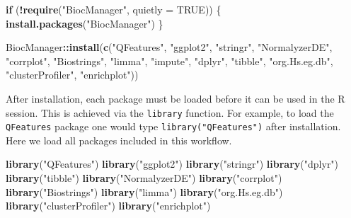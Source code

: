 \documentclass[9pt,a4paper,]{extarticle}
\newenvironment{Shaded}{\begin{snugshade}}{\end{snugshade}}
\newcommand{\AttributeTok}[1]{\textcolor[rgb]{0.13,0.29,0.53}{#1}}
\newcommand{\ConstantTok}[1]{\textcolor[rgb]{0.56,0.35,0.01}{#1}}
\newcommand{\ControlFlowTok}[1]{\textcolor[rgb]{0.13,0.29,0.53}{\textbf{#1}}}
\newcommand{\FunctionTok}[1]{\textcolor[rgb]{0.13,0.29,0.53}{\textbf{#1}}}
\newcommand{\NormalTok}[1]{#1}
\newcommand{\SpecialCharTok}[1]{\textcolor[rgb]{0.81,0.36,0.00}{\textbf{#1}}}
\newcommand{\StringTok}[1]{\textcolor[rgb]{0.31,0.60,0.02}{#1}}
\begin{document}
\begin{Shaded}
\begin{Highlighting}[]
\ControlFlowTok{if}\NormalTok{ (}\SpecialCharTok{!}\FunctionTok{require}\NormalTok{(}\StringTok{"BiocManager"}\NormalTok{, }\AttributeTok{quietly =} \ConstantTok{TRUE}\NormalTok{)) \{}
  \FunctionTok{install.packages}\NormalTok{(}\StringTok{"BiocManager"}\NormalTok{)}
\NormalTok{\}}

\NormalTok{BiocManager}\SpecialCharTok{::}\FunctionTok{install}\NormalTok{(}\FunctionTok{c}\NormalTok{(}\StringTok{"QFeatures"}\NormalTok{,}
                       \StringTok{"ggplot2"}\NormalTok{,}
                       \StringTok{"stringr"}\NormalTok{,}
                       \StringTok{"NormalyzerDE"}\NormalTok{,}
                       \StringTok{"corrplot"}\NormalTok{,}
                       \StringTok{"Biostrings"}\NormalTok{,}
                       \StringTok{"limma"}\NormalTok{,}
                       \StringTok{"impute"}\NormalTok{,}
                       \StringTok{"dplyr"}\NormalTok{,}
                       \StringTok{"tibble"}\NormalTok{,}
                       \StringTok{"org.Hs.eg.db"}\NormalTok{,}
                       \StringTok{"clusterProfiler"}\NormalTok{,}
                       \StringTok{"enrichplot"}\NormalTok{))}
\end{Highlighting}
\end{Shaded}

After installation, each package must be loaded before it can be used in the R
session. This is achieved via the \texttt{library} function. For example, to load the
\texttt{QFeatures} package one would type \texttt{library("QFeatures")} after installation.
Here we load all packages included in this workflow.

\begin{Shaded}
\begin{Highlighting}[]
\FunctionTok{library}\NormalTok{(}\StringTok{"QFeatures"}\NormalTok{)}
\FunctionTok{library}\NormalTok{(}\StringTok{"ggplot2"}\NormalTok{)}
\FunctionTok{library}\NormalTok{(}\StringTok{"stringr"}\NormalTok{)}
\FunctionTok{library}\NormalTok{(}\StringTok{"dplyr"}\NormalTok{)}
\FunctionTok{library}\NormalTok{(}\StringTok{"tibble"}\NormalTok{)}
\FunctionTok{library}\NormalTok{(}\StringTok{"NormalyzerDE"}\NormalTok{)}
\FunctionTok{library}\NormalTok{(}\StringTok{"corrplot"}\NormalTok{)}
\FunctionTok{library}\NormalTok{(}\StringTok{"Biostrings"}\NormalTok{)}
\FunctionTok{library}\NormalTok{(}\StringTok{"limma"}\NormalTok{)}
\FunctionTok{library}\NormalTok{(}\StringTok{"org.Hs.eg.db"}\NormalTok{)}
\FunctionTok{library}\NormalTok{(}\StringTok{"clusterProfiler"}\NormalTok{)}
\FunctionTok{library}\NormalTok{(}\StringTok{"enrichplot"}\NormalTok{)}
\end{Highlighting}
\end{Shaded}
\end{document}
